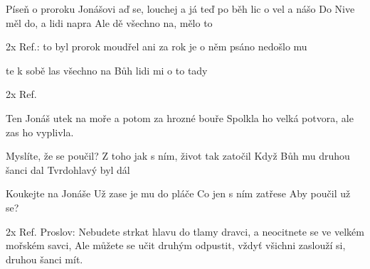 \begin{TEXT}{Píseň o proroku Jonášovi}
\SLOKA* {}aď se, louchej a já  teď po\NL
{}běh lic o vel a nášo\NL
Do Nive měl do, a  lidi napra\NL
Ale dě všechno na,  mělo to 

\REFREN 2x Ref.:  to byl prorok  \NL
{}moudřel ani za rok  \NL
{} je o něm psáno  \NL
{} nedošlo mu 

\SLOKA {}te k sobě las\NL
{} všechno na\NL
{} Bůh lidi mi\NL
{} o to tady 

\REFREN 2x Ref.

\SLOKA Ten Jonáš utek na moře\NL
a potom za hrozné bouře\NL
Spolkla ho velká potvora,\NL    
ale zas ho vyplivla.

\SLOKA Myslíte, že se poučil?\NL
Z toho jak s ním, život tak zatočil\NL
Když Bůh mu druhou šanci dal\NL
Tvrdohlavý byl dál

\SLOKA Koukejte na Jonáše\NL
Už zase je mu do pláče\NL
Co jen s ním zatřese\NL
Aby poučil už se?

\REFREN 2x Ref.
\SLOKA* Proslov: Nebudete strkat hlavu do tlamy dravci,\NL
a neocitnete se ve velkém mořském savci,\NL
Ale můžete se učit druhým odpustit,\NL
vždyť všichni zaslouží si, druhou šanci mít.
\REFRENHRAJ
\end{TEXT}

